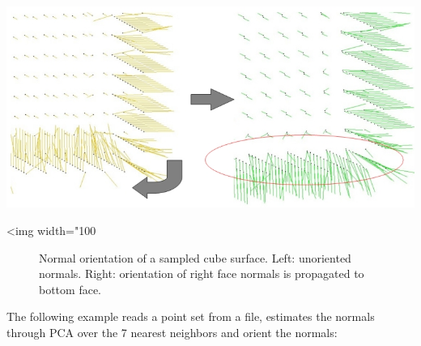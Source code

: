 \begin{center}
    \label{Point_set_processing_3-fig-mst_orient_normals}
    \begin{ccTexOnly}
        \includegraphics[width=1.0\textwidth]{Point_set_processing_3/mst_orient_normals} %
    \end{ccTexOnly}
    \begin{ccHtmlOnly}
        <img width="100%
    \end{ccHtmlOnly}
    \begin{figure}[h]
        \caption{Normal orientation of a sampled cube surface.
                 Left: unoriented normals.
                 Right: orientation of right face normals is propagated to bottom face.}
    \end{figure}
\end{center}

\ccExample

The following example reads a point set from a file, estimates the normals through PCA over the 7 nearest neighbors and orient the normals:


